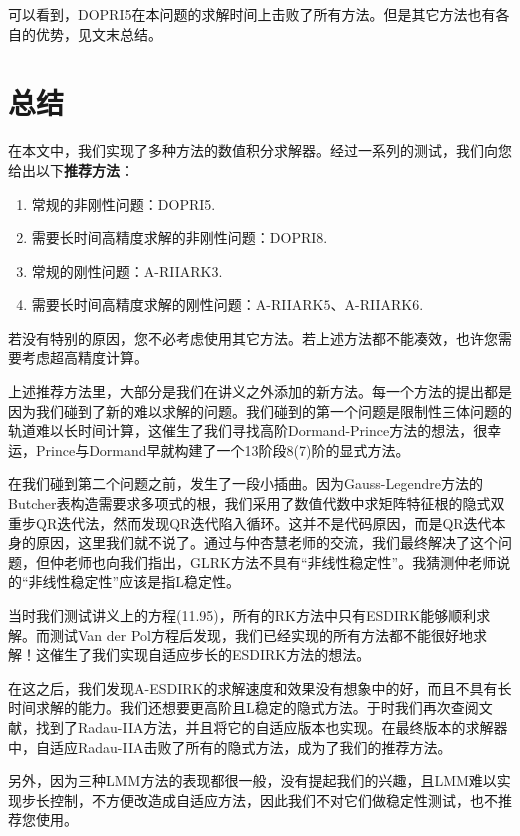 \documentclass[lang=cn,10pt,bibend=bibtex]{elegantbook}
\begin{document}
可以看到，DOPRI5在本问题的求解时间上击败了所有方法。但是其它方法也有各自的优势，见文末总结。

\chapter{总结}

在本文中，我们实现了多种方法的数值积分求解器。经过一系列的测试，我们向您给出以下\textbf{推荐方法}：

\begin{enumerate}[itemindent=1em]
  \item 常规的非刚性问题：DOPRI5.
  \item 需要长时间高精度求解的非刚性问题：DOPRI8.
  \item 常规的刚性问题：A-RIIARK$3$.
  \item 需要长时间高精度求解的刚性问题：A-RIIARK$5$、A-RIIARK$6$.
\end{enumerate}

若没有特别的原因，您不必考虑使用其它方法。若上述方法都不能凑效，也许您需要考虑超高精度计算。

上述推荐方法里，大部分是我们在讲义之外添加的新方法。每一个方法的提出都是因为我们碰到了新的难以求解的问题。我们碰到的第一个问题是限制性三体问题的轨道难以长时间计算，这催生了我们寻找高阶Dormand-Prince方法的想法，很幸运，Prince与Dormand早就构建了一个13阶段8(7)阶的显式方法。

在我们碰到第二个问题之前，发生了一段小插曲。因为Gauss-Legendre方法的Butcher表构造需要求多项式的根，我们采用了数值代数中求矩阵特征根的隐式双重步QR迭代法，然而发现QR迭代陷入循环。这并不是代码原因，而是QR迭代本身的原因，这里我们就不说了。通过与仲杏慧老师的交流，我们最终解决了这个问题，但仲老师也向我们指出，GLRK方法不具有“非线性稳定性”。我猜测仲老师说的“非线性稳定性”应该是指L稳定性。

当时我们测试讲义上的方程(11.95)，所有的RK方法中只有ESDIRK能够顺利求解。而测试Van der Pol方程后发现，我们已经实现的所有方法都不能很好地求解！这催生了我们实现自适应步长的ESDIRK方法的想法。

在这之后，我们发现A-ESDIRK的求解速度和效果没有想象中的好，而且不具有长时间求解的能力。我们还想要更高阶且L稳定的隐式方法。于时我们再次查阅文献，找到了Radau-IIA方法，并且将它的自适应版本也实现。在最终版本的求解器中，自适应Radau-IIA击败了所有的隐式方法，成为了我们的推荐方法。

另外，因为三种LMM方法的表现都很一般，没有提起我们的兴趣，且LMM难以实现步长控制，不方便改造成自适应方法，因此我们不对它们做稳定性测试，也不推荐您使用。
\end{document}
